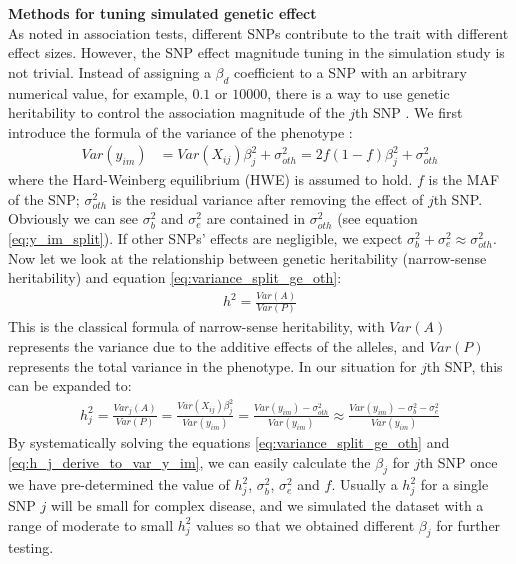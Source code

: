 \documentclass[12pt]{article}
\begin{document}
\textbf{Methods for tuning simulated genetic effect}\\
As noted in association tests, different SNPs contribute to the trait with different effect sizes. However, the SNP effect magnitude tuning in the simulation study is not trivial. Instead of assigning a $\beta_d$ coefficient to a SNP with an arbitrary numerical value, for example, $0.1$ or $10000$, there is a way to use genetic heritability to control the association magnitude of the $j$th SNP \cite{Lynch1998}. We first introduce the formula of the variance of the phenotype  :
\begin{align}
Var(y_{im} ) & = Var(X_{ij}) \beta_j^2 + \sigma_{oth} ^ 2  = 2f(1-f) \beta_j^2 + \sigma_{oth}^2
\label{eq:variance_split_ge_oth}
\end{align}
where the Hard-Weinberg equilibrium (HWE) is assumed to hold. $f$ is the MAF of the SNP; $\sigma_{oth}^2$ is the residual variance after removing the effect of $j$th SNP. Obviously we can see $\sigma_b^2$ and $\sigma_e^2$ are contained in $\sigma_{oth}^2$ (see equation \eqref{eq:y_im_split}). If other SNPs' effects are negligible, we expect $\sigma_b^2 + \sigma_e^2 \approx \sigma_{oth}^2$. Now let we look at the relationship between genetic heritability (narrow-sense heritability) and equation \eqref{eq:variance_split_ge_oth}:
\begin{align}
h^2 = \frac{Var(A)}{Var(P)}
\end{align}
This is the classical formula of narrow-sense heritability, with $Var(A)$ represents the variance due to the additive effects of the alleles, and $Var(P)$ represents the total variance in the phenotype. In our situation for $j$th SNP, this can be expanded to:
\begin{align}
h_j^2 = \frac{Var_j(A)}{Var(P)} = \frac{Var(X_{ij}) \beta_j^2 } {Var(y_{im} )} = \frac{Var(y_{im} ) - \sigma^2_{oth} } {Var(y_{im} )} \approx \frac{Var(y_{im} ) - \sigma_b^2 - \sigma_e^2 } {Var(y_{im} )}
\label{eq:h_j_derive_to_var_y_im}
\end{align}
By systematically solving the equations \eqref{eq:variance_split_ge_oth} and \eqref{eq:h_j_derive_to_var_y_im}, we can easily calculate the $\beta_j$ for $j$th SNP once we have pre-determined the value of $h_j^2$, $\sigma_b^2$, $\sigma_e^2$ and $f$. Usually a $h_j^2$ for a single SNP $j$ will be small for complex disease, and we simulated the dataset with a range of moderate to small $h_j^2$ values so that we obtained different $\beta_j$ for further testing.
\end{document}
